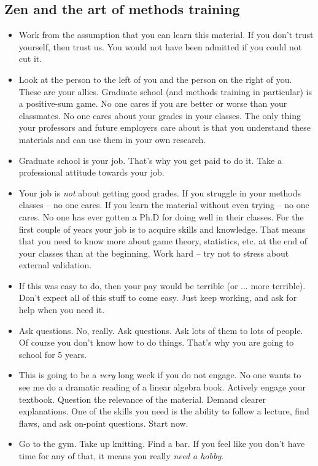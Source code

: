 \documentclass[20pt]{extarticle}
\newcommand{\bi}{\begin{itemize}}
\newcommand{\ei}{\end{itemize}}
\begin{document}
\subsection{Zen and the art of methods training}

\bi
\item Work from the assumption that you can learn this material.  If you
  don't trust yourself, then trust us.  You would not have been
  admitted if you could not cut it.  
\item Look at the person to the left of you and the person on the
  right of you.  These are your allies.  Graduate school (and methods
  training in particular) is a positive-sum game.  No one cares if you
  are better or worse than your classmates.  No one cares about your
  grades in your classes.  The only thing your professors and future
  employers care about is that you understand these materials and can
  use them in your own research.
\item Graduate school is your job.  That's why you get paid to do it.
  Take a professional attitude towards your job.    
\item Your job is \textit{not} about getting good grades.  If you
  struggle in your methods classes -- no one cares.  If you learn the
  material without even trying -- no one cares.  No one has ever
  gotten a Ph.D for doing well in their classes.  For the first couple
  of years your job is to acquire skills and knowledge.  That means
  that you need to know more about game theory, statistics, etc. at
  the end of your classes than at the beginning.  Work hard -- try not
  to stress about external validation.
\item If this was easy to do, then your pay would be terrible (or
  ... more terrible).  Don't expect all of this stuff to come easy.
  Just keep working, and ask for help when you need it.
\item Ask questions.  No, really.  Ask questions.  Ask lots of them
  to lots of people.  Of course you don't know how to do things.
  That's why you are going to school for 5 years.
\item This is going to be a \textit{very} long week if you do not
  engage.  No one wants to see me do a dramatic reading of a linear
  algebra book.  Actively engage your textbook.  Question the
  relevance of the material.  Demand clearer explanations.  One of the
  skills you need is the ability to follow a lecture, find flaws, and
  ask on-point questions.  Start now.
\item Go to the gym.  Take up knitting.  Find a bar.  If you feel like
  you don't have time for any of that, it means you really
  \textit{need a hobby}.  \ei
\end{document}
